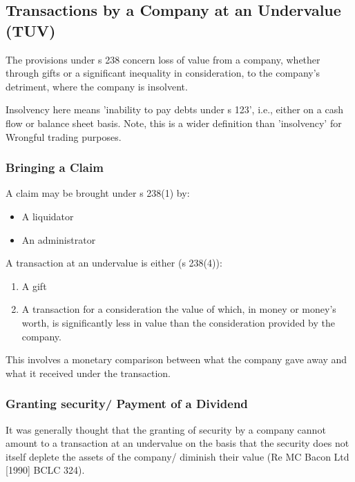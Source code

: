 \documentclass[
]{article}
\providecommand{\tightlist}{%
  \setlength{\itemsep}{0pt}\setlength{\parskip}{0pt}}
\begin{document}
\hypertarget{transactions-by-a-company-at-an-undervalue-tuv}{%
\subsection{Transactions by a Company at an Undervalue
(TUV)}\label{transactions-by-a-company-at-an-undervalue-tuv}}

The provisions under s 238 concern loss of value from a company, whether
through gifts or a significant inequality in consideration, to the
company's detriment, where the company is insolvent.

Insolvency here means 'inability to pay debts under s 123', i.e., either
on a cash flow or balance sheet basis. Note, this is a wider definition
than 'insolvency' for Wrongful trading purposes.

\hypertarget{bringing-a-claim-1}{%
\subsubsection{Bringing a Claim}\label{bringing-a-claim-1}}

A claim may be brought under s 238(1) by:

\begin{itemize}
\tightlist
\item
  A liquidator
\item
  An administrator
\end{itemize}

A transaction at an undervalue is either (s 238(4)):

\begin{enumerate}
\tightlist
\item
  A gift
\item
  A transaction for a consideration the value of which, in money or
  money's worth, is significantly less in value than the consideration
  provided by the company.
\end{enumerate}

This involves a monetary comparison between what the company gave away
and what it received under the transaction.

\hypertarget{granting-security-payment-of-a-dividend}{%
\subsubsection{Granting security/ Payment of a
Dividend}\label{granting-security-payment-of-a-dividend}}

It was generally thought that the granting of security by a company
cannot amount to a transaction at an undervalue on the basis that the
security does not itself deplete the assets of the company/ diminish
their value (Re MC Bacon Ltd {[}1990{]} BCLC 324).
\end{document}
